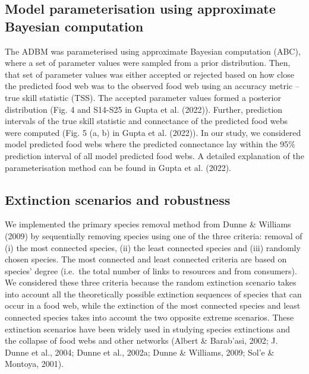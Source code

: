 \documentclass{article}
\begin{document}
\hypertarget{model-parameterisation-using-approximate-bayesian-computation}{%
\subsection{Model parameterisation using approximate Bayesian
computation}\label{model-parameterisation-using-approximate-bayesian-computation}}

The ADBM was parameterised using approximate Bayesian computation (ABC),
where a set of parameter values were sampled from a prior distribution.
Then, that set of parameter values was either accepted or rejected based
on how close the predicted food web was to the observed food web using
an accuracy metric -- true skill statistic (TSS). The accepted parameter
values formed a posterior distribution (Fig. 4 and S14-S25 in Gupta et
al. (2022)). Further, prediction intervals of the true skill statistic
and connectance of the predicted food webs were computed (Fig. 5 (a, b)
in Gupta et al. (2022)). In our study, we considered model predicted
food webs where the predicted connectance lay within the 95\% prediction
interval of all model predicted food webs. A detailed explanation of the
parameterisation method can be found in Gupta et al. (2022).

\hypertarget{extinction-scenarios-and-robustness}{%
\subsection{Extinction scenarios and
robustness}\label{extinction-scenarios-and-robustness}}

We implemented the primary species removal method from Dunne \& Williams
(2009) by sequentially removing species using one of the three criteria:
removal of (i) the most connected species, (ii) the least connected
species and (iii) randomly chosen species. The most connected and least
connected criteria are based on species' degree (i.e.~the total number
of links to resources and from consumers). We considered these three
criteria because the random extinction scenario takes into account all
the theoretically possible extinction sequences of species that can
occur in a food web, while the extinction of the most connected species
and least connected species takes into account the two opposite extreme
scenarios. These extinction scenarios have been widely used in studying
species extinctions and the collapse of food webs and other networks
(Albert \& Barab'asi, 2002; J. Dunne et al., 2004; Dunne et al., 2002a;
Dunne \& Williams, 2009; Sol'e \& Montoya, 2001).
\end{document}
